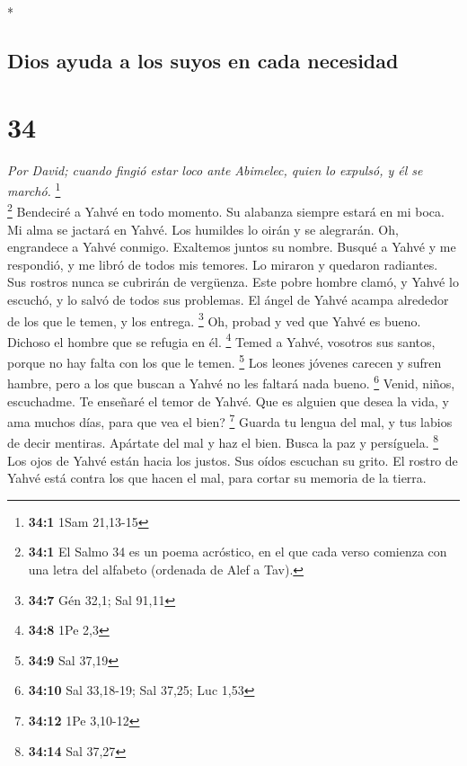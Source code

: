 \begin{paracol}{2}
\switchcolumn[0]*

\hypertarget{dios-ayuda-a-los-suyos-en-cada-necesidad}{%
\subsection{Dios ayuda a los suyos en cada
necesidad}\label{dios-ayuda-a-los-suyos-en-cada-necesidad}}

\hypertarget{section-66}{%
\section{34}\label{section-66}}

\emph{Por David; cuando fingió estar loco ante Abimelec, quien lo
expulsó, y él se marchó.} \footnote{\textbf{34:1} 1Sam 21,13-15}\\
 \footnote{\textbf{34:1} El Salmo 34 es un poema
  acróstico, en el que cada verso comienza con una letra del alfabeto
  (ordenada de Alef a Tav).} Bendeciré a Yahvé en todo momento. Su
alabanza siempre estará en mi boca.  Mi alma se jactará en
Yahvé. Los humildes lo oirán y se alegrarán.  Oh,
engrandece a Yahvé conmigo. Exaltemos juntos su nombre. 
Busqué a Yahvé y me respondió, y me libró de todos mis temores.
 Lo miraron y quedaron radiantes. Sus rostros nunca se
cubrirán de vergüenza.  Este pobre hombre clamó, y Yahvé
lo escuchó, y lo salvó de todos sus problemas.  El ángel
de Yahvé acampa alrededor de los que le temen, y los entrega.
\footnote{\textbf{34:7} Gén 32,1; Sal 91,11}  Oh, probad y
ved que Yahvé es bueno. Dichoso el hombre que se refugia en él.
\footnote{\textbf{34:8} 1Pe 2,3}  Temed a Yahvé, vosotros
sus santos, porque no hay falta con los que le temen. \footnote{\textbf{34:9}
  Sal 37,19}  Los leones jóvenes carecen y sufren hambre,
pero a los que buscan a Yahvé no les faltará nada bueno. \footnote{\textbf{34:10}
  Sal 33,18-19; Sal 37,25; Luc 1,53}  Venid, niños,
escuchadme. Te enseñaré el temor de Yahvé.  Que es
alguien que desea la vida, y ama muchos días, para que vea el bien?
\footnote{\textbf{34:12} 1Pe 3,10-12}  Guarda tu lengua
del mal, y tus labios de decir mentiras.  Apártate del
mal y haz el bien. Busca la paz y persíguela. \footnote{\textbf{34:14}
  Sal 37,27}  Los ojos de Yahvé están hacia los justos.
Sus oídos escuchan su grito.  El rostro de Yahvé está
contra los que hacen el mal, para cortar su memoria de la tierra.

\end{paracol}
